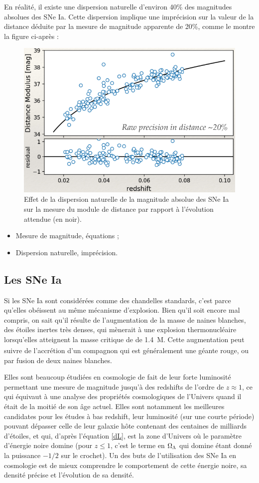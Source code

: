 \documentclass[a4paper, 12pt, svgnames]{article}
\begin{document}
En réalité, il existe une dispersion naturelle d'environ 40\% des magnitudes
absolues des SNe Ia. Cette dispersion implique une imprécision sur la valeur de
la distance déduite par la mesure de magnitude apparente de 20\%, comme le
montre la figure ci-après :

\begin{figure}[htbp!]
    \centering
    \includegraphics[width = .5\linewidth]{Rapport_figures/disp_40.png}
    \caption{Effet de la dispersion naturelle de la magnitude absolue
    des SNe Ia sur la mesure du module de distance par rapport à l'évolution
attendue (en noir).}
    \captionsetup{justification=centering}
    \label{disp_40}
\end{figure}

\begin{itemize}
    \item Mesure de magnitude, équations ;
    \item Dispersion naturelle, imprécision.
\end{itemize}

\subsection{Les SNe Ia}

Si les SNe Ia sont considérées comme des chandelles standards, c'est parce
qu'elles obéissent au même mécanisme d'explosion. Bien qu'il soit encore mal
compris, on sait qu'il résulte de l'augmentation de la masse de naines
blanches, des étoiles inertes très denses, qui mènerait à une explosion
thermonucléaire lorsqu'elles atteignent la masse critique de 
de \SI{1.4}{M_\odot}. Cette augmentation peut suivre de l'accrétion d'un
compagnon qui est généralement une géante rouge, ou par fusion de deux naines
blanches.

Elles sont beaucoup étudiées en cosmologie de fait de leur forte luminosité
permettant une mesure de magnitude jusqu'à des redshifts de l'ordre de $z
\approx 1$, ce qui équivaut à une analyse des propriétés cosmologiques de
l'Univers quand il était de la moitié de son âge actuel. Elles sont notamment
les meilleures candidates pour les études à bas redshift, leur luminosité (sur
une courte période) pouvant dépasser celle de leur galaxie hôte contenant des
centaines de milliards d'étoiles,  et qui, d'après l'équation \ref{dL}, est la
zone d'Univers où le paramètre d'énergie noire domine (pour $z \leq 1$, c'est le
terme en $\Omega_\Lambda$ qui domine étant donné la puissance $-1/2$ sur le crochet). Un
des buts de l'utilisation des SNe Ia en cosmologie est de mieux comprendre le
comportement de cette énergie noire, sa densité précise et l'évolution de sa
densité.
\end{document}
